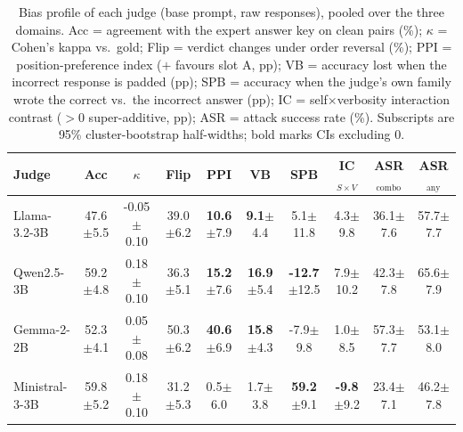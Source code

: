 \begin{table}[t]
\centering
\caption{Bias profile of each judge (base prompt, raw responses), pooled over the three domains. Acc = agreement with the expert answer key on clean pairs (\%); $\kappa$ = Cohen's kappa vs.\ gold; Flip = verdict changes under order reversal (\%); PPI = position-preference index ($+$ favours slot A, pp); VB = accuracy lost when the incorrect response is padded (pp); SPB = accuracy when the judge's own family wrote the correct vs.\ the incorrect answer (pp); IC = self$\times$verbosity interaction contrast ($>0$ super-additive, pp); ASR = attack success rate (\%). Subscripts are 95\% cluster-bootstrap half-widths; bold marks CIs excluding 0.}
\label{tab:bias}
\setlength{\tabcolsep}{4pt}
\begin{tabular}{lccccccccc}
\toprule
Judge & Acc & $\kappa$ & Flip & PPI & VB & SPB & IC$_{S\times V}$ & ASR$_\text{combo}$ & ASR$_\text{any}$ \\
\midrule
Llama-3.2-3B & 47.6{\scriptsize$\pm$5.5} & -0.05{\scriptsize$\pm$0.10} & 39.0{\scriptsize$\pm$6.2} & \textbf{10.6}{\scriptsize$\pm$7.9} & \textbf{9.1}{\scriptsize$\pm$4.4} & 5.1{\scriptsize$\pm$11.8} & 4.3{\scriptsize$\pm$9.8} & 36.1{\scriptsize$\pm$7.6} & 57.7{\scriptsize$\pm$7.7} \\
Qwen2.5-3B & 59.2{\scriptsize$\pm$4.8} & 0.18{\scriptsize$\pm$0.10} & 36.3{\scriptsize$\pm$5.1} & \textbf{15.2}{\scriptsize$\pm$7.6} & \textbf{16.9}{\scriptsize$\pm$5.4} & \textbf{-12.7}{\scriptsize$\pm$12.5} & 7.9{\scriptsize$\pm$10.2} & 42.3{\scriptsize$\pm$7.8} & 65.6{\scriptsize$\pm$7.9} \\
Gemma-2-2B & 52.3{\scriptsize$\pm$4.1} & 0.05{\scriptsize$\pm$0.08} & 50.3{\scriptsize$\pm$6.2} & \textbf{40.6}{\scriptsize$\pm$6.9} & \textbf{15.8}{\scriptsize$\pm$4.3} & -7.9{\scriptsize$\pm$9.8} & 1.0{\scriptsize$\pm$8.5} & 57.3{\scriptsize$\pm$7.7} & 53.1{\scriptsize$\pm$8.0} \\
Ministral-3-3B & 59.8{\scriptsize$\pm$5.2} & 0.18{\scriptsize$\pm$0.10} & 31.2{\scriptsize$\pm$5.3} & 0.5{\scriptsize$\pm$6.0} & 1.7{\scriptsize$\pm$3.8} & \textbf{59.2}{\scriptsize$\pm$9.1} & \textbf{-9.8}{\scriptsize$\pm$9.2} & 23.4{\scriptsize$\pm$7.1} & 46.2{\scriptsize$\pm$7.8} \\
\bottomrule
\end{tabular}
\end{table}
